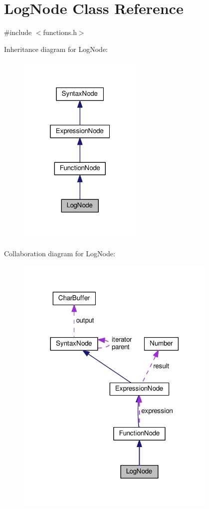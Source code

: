 \hypertarget{classLogNode}{}\section{Log\+Node Class Reference}
\label{classLogNode}


{\ttfamily \#include $<$functions.\+h$>$}



Inheritance diagram for Log\+Node\+:\nopagebreak
\begin{figure}[H]
\begin{center}
\leavevmode
\includegraphics[width=169pt]{classLogNode__inherit__graph}
\end{center}
\end{figure}


Collaboration diagram for Log\+Node\+:\nopagebreak
\begin{figure}[H]
\begin{center}
\leavevmode
\includegraphics[width=272pt]{classLogNode__coll__graph}
\end{center}
\end{figure}
